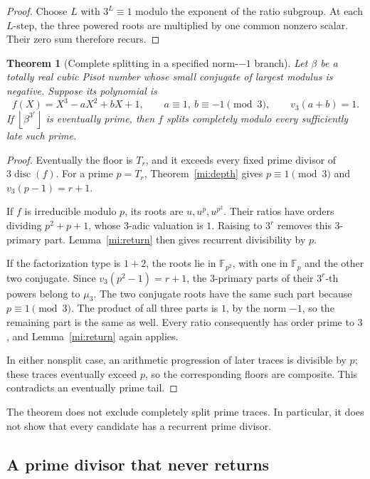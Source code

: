 \documentclass[11pt,a4paper]{article}
\numberwithin{equation}{section}
\newtheorem{theorem}{Theorem}[section]
\theoremstyle{definition}
\theoremstyle{remark}
\newcommand{\floor}[1]{\left\lfloor #1\right\rfloor}
\begin{document}
\begin{proof}
Choose \(L\) with \(3^L\equiv1\) modulo the exponent of the
ratio subgroup. At each \(L\)-step, the three powered roots
are multiplied by one common nonzero scalar. Their zero sum
therefore recurs.
\end{proof}

\begin{theorem}[Complete splitting in a specified norm-\(-1\) branch]
\label{mi:splitting}
Let \(\beta\) be a totally real cubic Pisot number whose small
conjugate of largest modulus is negative. Suppose its polynomial is
\[
 f(X)=X^3-aX^2+bX+1,\qquad
 a\equiv1,\ b\equiv-1\pmod3,\qquad v_3(a+b)=1.
\]
If \(\floor{\beta^{3^r}}\) is eventually prime, then \(f\)
splits completely modulo every sufficiently late such prime.
\end{theorem}

\begin{proof}
Eventually the floor is \(T_r\), and it exceeds every fixed
prime divisor of \(3\operatorname{disc}(f)\).
For a prime \(p=T_r\), Theorem~\ref{mi:depth} gives
\(p\equiv1\pmod3\) and \(v_3(p-1)=r+1\).

If \(f\) is irreducible modulo \(p\), its roots are
\(u,u^p,u^{p^2}\). Their ratios have orders dividing
\(p^2+p+1\), whose \(3\)-adic valuation is \(1\).
Raising to \(3^r\) removes this \(3\)-primary part.
Lemma~\ref{mi:return} then gives recurrent divisibility by \(p\).

If the factorization type is \(1+2\), the roots lie in
\(\mathbb F_{p^2}\), with one in \(\mathbb F_p\) and the other
two conjugate. Since \(v_3(p^2-1)=r+1\), the \(3\)-primary
parts of their \(3^r\)-th powers belong to \(\mu_3\).
The two conjugate roots have the same such part because
\(p\equiv1\pmod3\). The product of all three parts is \(1\),
by the norm \(-1\), so the remaining part is the same as well.
Every ratio consequently has order prime to \(3\), and
Lemma~\ref{mi:return} again applies.

In either nonsplit case, an arithmetic progression of later
traces is divisible by \(p\); these traces eventually exceed
\(p\), so the corresponding floors are composite. This
contradicts an eventually prime tail.
\end{proof}

The theorem does not exclude completely split prime traces.
In particular, it does not show that every candidate has a
recurrent prime divisor.

\subsection{A prime divisor that never returns}
\label{mi:nonreturn}
\end{document}
